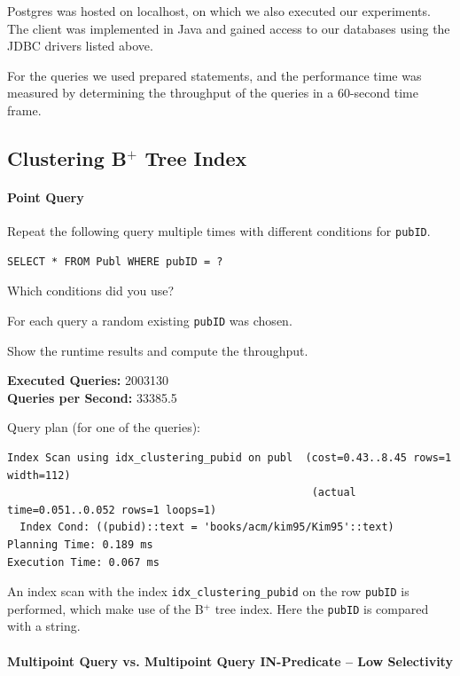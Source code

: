 \documentclass[11pt]{scrartcl}
\begin{document}
Postgres was hosted on localhost, on which we also executed our experiments.
The client was implemented in Java and gained access to our databases using the JDBC drivers listed above.

For the queries we used prepared statements, and the performance time was measured by determining the throughput of the
queries in a 60-second time frame.

\subsection*{Clustering B$^+$ Tree Index}

\paragraph{Point Query}

Repeat the following query multiple times with different conditions for \texttt{pubID}.

\begin{lstlisting}[style=dbtsql]
SELECT * FROM Publ WHERE pubID = ?
\end{lstlisting}

Which conditions did you use?

For each query a random existing \texttt{pubID} was chosen.

Show the runtime results and compute the throughput.

\textbf{Executed Queries: } 2003130 \\
\textbf{Queries per Second: } 33385.5

Query plan (for one of the queries):

{\small
\parskip0pt\begin{verbatim}
Index Scan using idx_clustering_pubid on publ  (cost=0.43..8.45 rows=1 width=112)
                                                (actual time=0.051..0.052 rows=1 loops=1)
  Index Cond: ((pubid)::text = 'books/acm/kim95/Kim95'::text)
Planning Time: 0.189 ms
Execution Time: 0.067 ms
\end{verbatim}}

An index scan with the index \texttt{idx\_clustering\_pubid} on the row \texttt{pubID} is performed, which make use of the B$^+$ tree index.
Here the \texttt{pubID} is compared with a string.

\paragraph{Multipoint Query vs. Multipoint Query IN-Predicate -- Low Selectivity}
\end{document}
